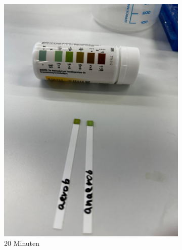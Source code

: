 \documentclass[10pt,a4paper]{article}
\begin{document}
\begin{figure}[H]
\begin{subfigure}[b]{0.4\textwidth}
			\includegraphics[width=\textwidth]{PHOTO-2024-07-04-23-51-28 2.jpg}
			\caption{20 Minuten}
			\label{fig:20 min}
		\end{subfigure}
		\hfill
		\begin{subfigure}[b]{0.4\textwidth}

\end{subfigure}
\end{figure}
\end{document}
